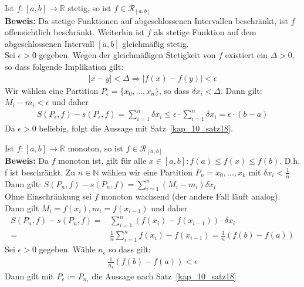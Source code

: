 \begin{Satz}{\label{kap10_satz20}
	Ist $f: [a,b] \rightarrow \mathbb{R}$ stetig, so ist 
	$ f \in \mathcal{R}_{[a,b]}$ \\
	\textbf{Beweis:} Da stetige Funktionen auf abgeschlossenen Intervallen 
	beschränkt, ist $f$ offensichtlich beschränkt. Weiterhin ist $f$ als stetige 
	Funktion auf dem abgeschlossenen Intervall $[a,b]$ gleichmäßig stetig. \\
	Sei $\epsilon > 0 $ gegeben. Wegen der gleichmäßigen Stetigkeit von $f$ 
	existiert ein $\Delta > 0$, so dass folgende Implikation gilt:
	\begin{align*}
		\vert x - y \vert < \Delta \Rightarrow \vert f(x) -f(y) \vert < \epsilon
	\end{align*}
	Wir wählen eine Partition $P_{\epsilon} = \{ x_0, \hdots, x_n \}$, so dass 
	$\delta x_i < \Delta$. Dann gilt: $M_i - m_i < \epsilon$ und daher
	\begin{align*}
		S(P_{\epsilon},f) - s(P_{\epsilon},f) = \sum_{i = 1}^n \delta x_i 
		\leq \epsilon \cdot \sum_{i = 1}^n \delta x_i = \epsilon \cdot (b-a)
	\end{align*}
	Da $\epsilon > 0$ beliebig, folgt die Aussage mit Satz~\ref{kap_10_satz18}.
}\end{Satz}

\begin{Satz}{
	Ist $f: [a,b] \rightarrow \mathbb{R}$ monoton, so ist $f \in \mathcal{R}_{[a,b]}
	$\\
	\textbf{Beweis:} Da $f$ monoton ist, gilt für alle $x \in [a,b]: f(a) \leq f(x) 
	\leq f(b)$. D.h. f ist beschränkt. Zu $n \in \mathbb{N}$ wählen wir eine 
	Partition $P_n = {x_0, \hdots, x_k}$ mit $\delta x_i < \frac{1}{n}$\\
	Dann gilt: $S(P_n, f) - s(P_n,f) = \sum_{i=1}^n (M_i - m_i)\delta x_i$ \\
	Ohne Einschränkung sei $f$ monoton wachsend (der andere Fall läuft analog). \\
	Dann gilt $M_i = f(x_i), m_i = f(x_{i-1})$ und daher 
	\begin{align*}
		S(P_n, f) - s(P_n,f) = & \sum_{i=1}^n (f(x_i) -f(x_{i-1}))\cdot \delta x_i 
		\\ = & \frac{1}{	n}\sum_{i=1}^n f(x_i) -f(x_{i-1}) = 
		\frac{1}{n} (f(b) -f(a)) 
	\end{align*}
	Sei $\epsilon > 0$ gegeben. Wähle $n_{\epsilon}$ so dass gilt:
	\begin{align*}
		\frac{1}{n_{\epsilon}}(f(b) -f(a)) < \epsilon
	\end{align*}
	Dann gilt mit $P_{\epsilon} := P_{n_{\epsilon}}$ die Aussage nach Satz~\ref{kap_10_satz18}
}\end{Satz}

